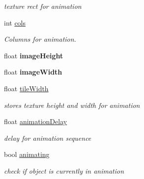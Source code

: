 \begin{DoxyCompactItemize}
\begin{DoxyCompactList}\small\item\em texture rect for animation \end{DoxyCompactList}\item 
\hypertarget{class_movable_a5eafe8f13e492e43b47d5a97d85badcb}{int \hyperlink{class_movable_a5eafe8f13e492e43b47d5a97d85badcb}{cols}}\label{class_movable_a5eafe8f13e492e43b47d5a97d85badcb}

\begin{DoxyCompactList}\small\item\em Columns for animation. \end{DoxyCompactList}\item 
\hypertarget{class_movable_a0935c58ae1e43d05d6a3887c947d7f7e}{float {\bfseries image\-Height}}\label{class_movable_a0935c58ae1e43d05d6a3887c947d7f7e}

\item 
\hypertarget{class_movable_a4383f3e3c5f60088838458d05b4b9c48}{float {\bfseries image\-Width}}\label{class_movable_a4383f3e3c5f60088838458d05b4b9c48}

\item 
\hypertarget{class_movable_a9dec862effcc876c6f1500fa214bc550}{float \hyperlink{class_movable_a9dec862effcc876c6f1500fa214bc550}{tile\-Width}}\label{class_movable_a9dec862effcc876c6f1500fa214bc550}

\begin{DoxyCompactList}\small\item\em stores texture height and width for animation \end{DoxyCompactList}\item 
\hypertarget{class_movable_a2f7229b260b7b6282a262dca99fc6770}{float \hyperlink{class_movable_a2f7229b260b7b6282a262dca99fc6770}{animation\-Delay}}\label{class_movable_a2f7229b260b7b6282a262dca99fc6770}

\begin{DoxyCompactList}\small\item\em delay for animation sequence \end{DoxyCompactList}\item 
\hypertarget{class_movable_a2d7847d46b685a3d873afec5be1adddc}{bool \hyperlink{class_movable_a2d7847d46b685a3d873afec5be1adddc}{animating}}\label{class_movable_a2d7847d46b685a3d873afec5be1adddc}

\begin{DoxyCompactList}\small\item\em check if object is currently in animation \end{DoxyCompactList}\end{DoxyCompactItemize}


